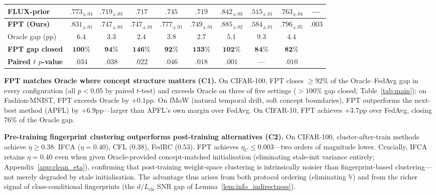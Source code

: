 \documentclass[11pt]{article}
\newcommand{\V}{\mathbb{V}}
\begin{document}
\begin{table}[t]
\begin{tabular}{@{}l ccccc ccc c@{}}
FLUX-prior    & $.773_{\pm.04}$ & $.719_{\pm.03}$ & $.717$ & $.745$ & $.719$ & $.842_{\pm.03}$ & $.515_{\pm.01}$ & $.763_{\pm.04}$ & --- \\
\midrule
\textbf{FPT (Ours)} & $\mathbf{.831}_{\pm.01}$ & $\mathbf{.747}_{\pm.03}$ & $\mathbf{.747}_{\pm.01}$ & $\mathbf{.777}_{\pm.01}$ & $\mathbf{.749}_{\pm.01}$ & $\mathbf{.885}_{\pm.02}$ & $\mathbf{.584}_{\pm.01}$ & $\mathbf{.796}_{\pm.05}$ & $\mathbf{.003}$ \\
\midrule
Oracle gap (pp) & $6.4$ & $3.3$ & $2.4$ & $3.8$ & $2.7$ & $5.1$ & $9.3$ & $4.4$ & \\
\textbf{FPT gap closed} & $\mathbf{100\%}$ & $\mathbf{94\%}$ & $\mathbf{146\%}$ & $\mathbf{92\%}$ & $\mathbf{133\%}$ & $\mathbf{102\%}$ & $\mathbf{84\%}$ & $\mathbf{82\%}$ & \\
\textbf{Paired $t$ $p$-value} & $.034$ & $.038$ & $.022$ & $.046$ & $.018$ & $.001$ & --- & $.010$ & \\
\bottomrule
\end{tabular}
\end{table}

\textbf{FPT matches Oracle where concept structure matters (C1).}
On CIFAR-100, FPT closes $\ge 92\%$ of the Oracle--FedAvg gap in every configuration (all $p<0.05$ by paired $t$-test) and exceeds Oracle on three of five settings ($>100\%$ gap closed; Table~\ref{tab:main}); on Fashion-MNIST, FPT exceeds Oracle by $+0.1$pp.
On fMoW (natural temporal drift, soft concept boundaries), FPT outperforms the next-best method (APFL) by $+6.9$pp---larger than APFL's own margin over FedAvg.
On CIFAR-10, FPT achieves $+3.7$pp over FedAvg, closing 76\% of the Oracle gap.

\textbf{Pre-training fingerprint clustering outperforms post-training alternatives (C2).}
On CIFAR-100, cluster-after-train methods achieve $\eta \ge 0.38$: IFCA ($\eta = 0.40$), CFL ($0.38$), FedRC ($0.53$).
FPT achieves $\eta_C \le 0.003$---two orders of magnitude lower.
Crucially, IFCA retains $\eta = 0.40$ even when given Oracle-provided concept-matched initialisation (eliminating stale-init variance entirely; Appendix~\ref{app:clean_eta}), confirming that post-training weight-space clustering is intrinsically noisier than fingerprint-based clustering---not merely degraded by stale initialisation.
The advantage thus arises from both protocol ordering (eliminating $\V$) and from the richer signal of class-conditional fingerprints (the $d/L_{\mathrm{cls}}$ SNR gap of Lemma~\ref{lem:info_indirectness}).
\end{document}
